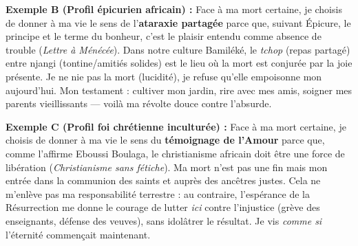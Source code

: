 \documentclass[11pt]{article}
\newcommand{\cle}[1]{{\popxbold\color{popdark}#1}}
\begin{document}
\begin{exoresolu}
\textbf{Exemple B (Profil épicurien africain) :}
\guillemotleft Face à ma mort certaine, je choisis de donner à ma vie le sens de l'\textbf{ataraxie partagée} parce que, suivant Épicure, \guillemotleft le principe et le terme du bonheur, c'est le plaisir \guillemotright entendu comme \cle{absence de trouble} (\emph{Lettre à Ménécée}). Dans notre culture Bamiléké, le \emph{tchop} (repas partagé) entre \cle{njangi} (tontine/amitiés solides) est le lieu où la mort est conjurée par la joie présente. Je ne nie pas la mort (lucidité), je refuse qu'elle empoisonne mon aujourd'hui. Mon testament : cultiver mon jardin, rire avec mes amis, soigner mes parents vieillissants — voilà ma révolte douce contre l'absurde. \guillemotright

\textbf{Exemple C (Profil foi chrétienne inculturée) :}
\guillemotleft Face à ma mort certaine, je choisis de donner à ma vie le sens du \textbf{témoignage de l'Amour} parce que, comme l'affirme Eboussi Boulaga, \guillemotleft le christianisme africain doit être une force de libération \guillemotright (\emph{Christianisme sans fétiche}). Ma mort n'est pas une fin mais mon entrée dans la \cle{communion des saints} et auprès des \cle{ancêtres} justes. Cela ne m'enlève pas ma responsabilité terrestre : au contraire, l'\cle{espérance} de la Résurrection me donne le courage de lutter \emph{ici} contre l'injustice (grève des enseignants, défense des veuves), sans idolâtrer le résultat. Je vis \emph{comme si} l'éternité commençait maintenant. \guillemotright


\end{exoresolu}
\end{document}
